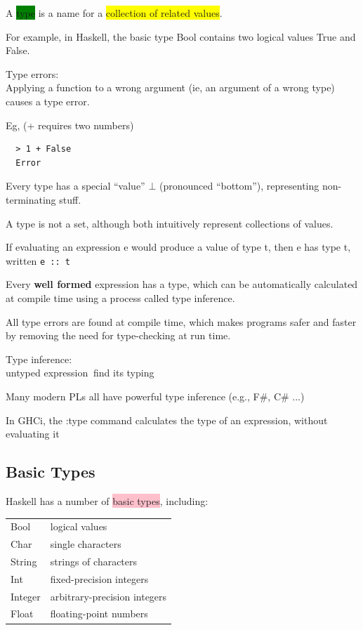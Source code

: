 \documentclass[tikz,border=10pt]{project_plan}
\begin{document}
A \colorbox{green}{type} is a name for a \colorbox{yellow}{collection of related values}.

For example, in Haskell, the basic type Bool contains two logical
values True and False.

Type errors:\\
Applying a function to a wrong argument (ie, an argument of a wrong type) causes a type error.

Eg, (+ requires two numbers)\\
\begin{lstlisting}
  > 1 + False
  Error
\end{lstlisting}

Every type has a special “value” $\bot$ (pronounced “bottom”), representing non-terminating stuff.

A type is not a set, although both intuitively represent collections of values.

If evaluating an expression e would produce a value of type t, then e has type t, written
\lstinline|e :: t|

Every \textbf{well formed} expression has a type, which can be
automatically calculated at compile time using a process
called type inference.

All type errors are found at compile time, which
makes programs safer and faster by removing the
need for type-checking at run time.

Type inference:\\
untyped expression \MVRightarrow$\ $find its typing

Many modern PLs all have powerful type inference (e.g., F\#, C\# ...)

In GHCi, the :type command calculates the type of an expression, without evaluating it

\subsection{Basic Types}

Haskell has a number of \colorbox{pink}{basic types}, including:

\begin{tabular}{l l}
  Bool    & logical values               \\
  Char    & single characters            \\
  String  & strings of characters        \\
  Int     & fixed-precision integers     \\
  Integer & arbitrary-precision integers \\
  Float   & floating-point numbers       \\ [1ex]
\end{tabular}
\end{document}
